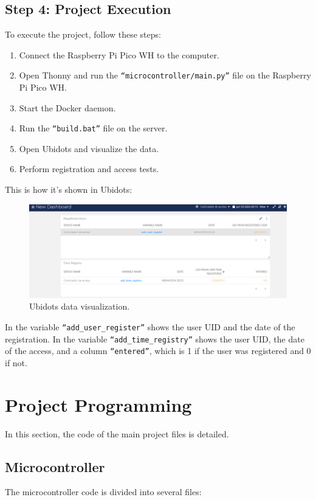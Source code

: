\documentclass{article}
\begin{document}
\subsection{Step 4: Project Execution}
To execute the project, follow these steps:
\begin{enumerate}
	\item Connect the Raspberry Pi Pico WH to the computer.
	\item Open Thonny and run the \texttt{``microcontroller/main.py''} file on the Raspberry Pi Pico WH.
	\item Start the Docker daemon.
	\item Run the \texttt{``build.bat''} file on the server.
	\item Open Ubidots and visualize the data.
	\item Perform registration and access tests.
\end{enumerate}
This is how it's shown in Ubidots:
\begin{figure}[H]
    \centering
    \includegraphics[width=1\linewidth]{../images/ubidots_visualizacion.png}
    \caption{\label{fig:ubidots_visualizacion}Ubidots data visualization.}
\end{figure}

In the variable \texttt{``add\_user\_register''} shows the user UID and the date of the registration.
In the variable \texttt{``add\_time\_registry''} shows the user UID, the date of the access, and a column \texttt{``entered''}, which is 1 if the user was registered and 0 if not.

\section{Project Programming}
In this section, the code of the main project files is detailed.

\subsection{Microcontroller}
The microcontroller code is divided into several files:
\end{document}
